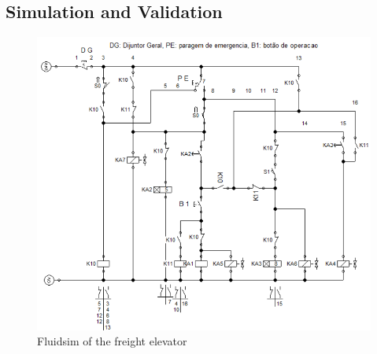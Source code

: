 \subsection{Simulation and Validation} \label{sec:Simulation_and_Validation}

\begin{figure}[H]
    \includegraphics[width=16cm]{Images/Q3/fluidsim_1.png}
    \centering
    \caption{Fluidsim of the freight elevator}
    \label{fig:fluidsim}
\end{figure}

